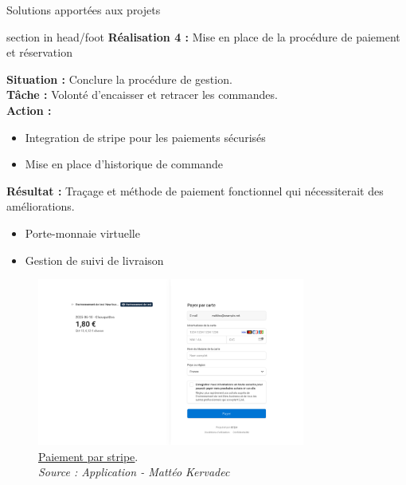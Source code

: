 \documentclass{beamer}
\begin{document}
\begin{frame}{Solutions apportées aux projets}
	\begin{beamercolorbox}[wd=\paperwidth,ht=1.5em,dp=0.5em,leftskip=0.5cm]{section in head/foot}
  		\large \textbf{Réalisation 4 :} \normalsize Mise en place de la procédure de paiement et réservation
	\end{beamercolorbox}
	\vspace{0.5em}
	\begin{center}
		 {	
	  		\begin{minipage}{0.9\textwidth}
  				\textbf{Situation :} Conclure la procédure de gestion. \pause \\
  				\textbf{Tâche :} Volonté d'encaisser et retracer les commandes. \pause \\
  				\textbf{Action :}
  				\begin{itemize}
  					\item Integration de stripe pour les paiements sécurisés
  					\item Mise en place d'historique de commande
  				\end{itemize}
  				\pause
  				
				\textbf{Résultat :} Traçage et méthode de paiement fonctionnel qui nécessiterait des améliorations.
				\begin{itemize}
					\item Porte-monnaie virtuelle
					\item Gestion de suivi de livraison
				\end{itemize}
  			\end{minipage}
  		}
  		
  		\only<5> {
			\begin{figure}[t]
  				\includegraphics[height=5.5cm]{../img/localhost/stripe.png}
				\caption{	
					\centering			
  					\href{https://github.com/Matteo-K/Soutenance_E-delic/blob/main/img/maquette/crud_produit.png}{\underline{Paiement par stripe}}.\\
  					\textit{Source : Application - Mattéo Kervadec}
				}
  				\label{fig:stripe}
  			\end{figure}
		}
		

\end{center}
\end{frame}
\end{document}
